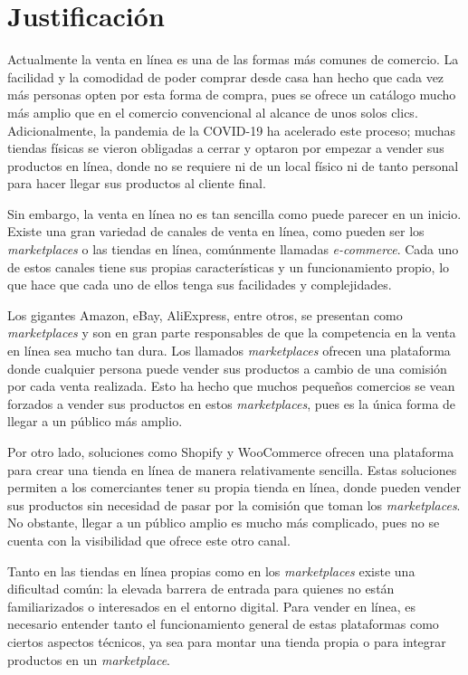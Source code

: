 \section{Justificación}
\label{intro:sec:justificacion}

Actualmente la venta en línea es una de las formas más comunes de comercio. La facilidad y la comodidad de poder comprar desde casa han hecho que cada vez más personas opten por esta forma de compra, pues se ofrece un catálogo mucho más amplio que en el comercio convencional al alcance de unos solos clics. Adicionalmente, la pandemia de la COVID-19 ha acelerado este proceso; muchas tiendas físicas se vieron obligadas a cerrar y optaron por empezar a vender sus productos en línea, donde no se requiere ni de un local físico ni de tanto personal para hacer llegar sus productos al cliente final.

Sin embargo, la venta en línea no es tan sencilla como puede parecer en un inicio. Existe una gran variedad de canales de venta en línea, como pueden ser los \textit{marketplaces} o las tiendas en línea, comúnmente llamadas \textit{e-commerce}. Cada uno de estos canales tiene sus propias características y un funcionamiento propio, lo que hace que cada uno de ellos tenga sus facilidades y complejidades.

Los gigantes Amazon, eBay, AliExpress, entre otros, se presentan como \textit{marketplaces} y son en gran parte responsables de que la competencia en la venta en línea sea mucho tan dura. Los llamados \textit{marketplaces} ofrecen una plataforma donde cualquier persona puede vender sus productos a cambio de una comisión por cada venta realizada. Esto ha hecho que muchos pequeños comercios se vean forzados a vender sus productos en estos \textit{marketplaces}, pues es la única forma de llegar a un público más amplio.

Por otro lado, soluciones como Shopify y WooCommerce ofrecen una plataforma para crear una tienda en línea de manera relativamente sencilla. Estas soluciones permiten a los comerciantes tener su propia tienda en línea, donde pueden vender sus productos sin necesidad de pasar por la comisión que toman los \textit{marketplaces}. No obstante, llegar a un público amplio es mucho más complicado, pues no se cuenta con la visibilidad que ofrece este otro canal.

Tanto en las tiendas en línea propias como en los \textit{marketplaces} existe una dificultad común: la elevada barrera de entrada para quienes no están familiarizados o interesados en el entorno digital. Para vender en línea, es necesario entender tanto el funcionamiento general de estas plataformas como ciertos aspectos técnicos, ya sea para montar una tienda propia o para integrar productos en un \textit{marketplace}.

